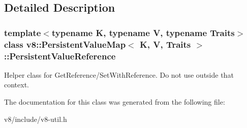 \subsection{Detailed Description}
\subsubsection*{template$<$typename K, typename V, typename Traits$>$class v8\+::\+Persistent\+Value\+Map$<$ K, V, Traits $>$\+::\+Persistent\+Value\+Reference}

Helper class for Get\+Reference/\+Set\+With\+Reference. Do not use outside that context. 

The documentation for this class was generated from the following file\+:\begin{DoxyCompactItemize}
\item 
v8/include/v8-\/util.\+h\end{DoxyCompactItemize}
